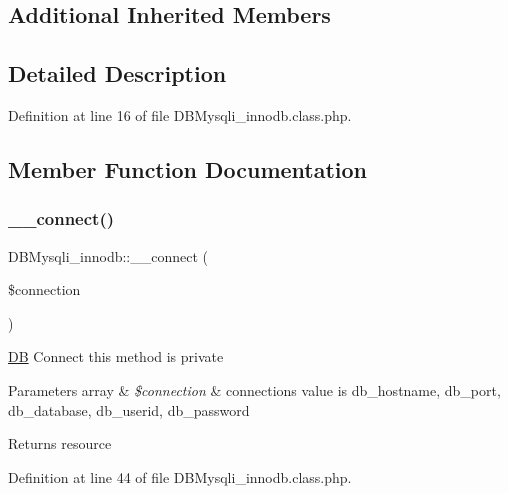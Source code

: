 \subsection*{Additional Inherited Members}


\subsection{Detailed Description}


Definition at line 16 of file D\+B\+Mysqli\+\_\+innodb.\+class.\+php.



\subsection{Member Function Documentation}
\mbox{\label{classDBMysqli__innodb_ab6db4cf73da0e11ed0045a07d751e334}} 
\subsubsection{\texorpdfstring{\+\_\+\+\_\+connect()}{\_\_connect()}}
{\footnotesize\ttfamily D\+B\+Mysqli\+\_\+innodb\+::\+\_\+\+\_\+connect (\begin{DoxyParamCaption}\item[{}]{\$connection }\end{DoxyParamCaption})}

\hyperlink{classDB}{DB} Connect this method is private 
\begin{DoxyParams}[1]{Parameters}
array & {\em \$connection} & connection\textquotesingle{}s value is db\+\_\+hostname, db\+\_\+port, db\+\_\+database, db\+\_\+userid, db\+\_\+password \\
\hline
\end{DoxyParams}
\begin{DoxyReturn}{Returns}
resource 
\end{DoxyReturn}


Definition at line 44 of file D\+B\+Mysqli\+\_\+innodb.\+class.\+php.

\mbox{\label{classDBMysqli__innodb_a02098642ca57c84b9061172e8a3b8d17}} 
